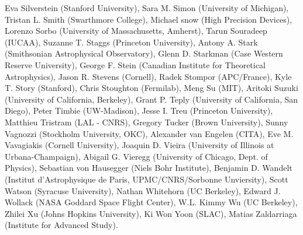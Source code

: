 Eva Silverstein (Stanford University),
Sara M. Simon (University of Michigan),
Tristan L. Smith (Swarthmore College),
Michael snow (High Precision Devices),
Lorenzo Sorbo (University of Massachusetts, Amherst),
Tarun Souradeep (IUCAA),
Suzanne T. Staggs (Princeton University),
Antony A. Stark (Smithsonian Astrophysical Observatory),
Glenn D. Starkman (Case Western Reserve University),
George F. Stein (Canadian Institute for Theoretical Astrophysics),
Jason R. Stevens (Cornell),
Radek Stompor (APC/France),
Kyle T. Story (Stanford),
Chris Stoughton (Fermilab),
Meng Su (MIT),
Aritoki Suzuki (University of California, Berkeley),
Grant P. Teply (University of California, San Diego),
Peter Timbie (UW-Madison),
Jesse I. Treu (Princeton University),
Matthieu Tristram (LAL - CNRS),
Gregory Tucker (Brown University),
Sunny Vagnozzi (Stockholm University, OKC),
Alexander van Engelen (CITA),
Eve M. Vavagiakis (Cornell University),
Joaquin D. Vieira (University of Illinois at Urbana-Champaign),
Abigail G. Vieregg (University of Chicago, Dept. of Physics),
Sebastian von Hausegger (Niels Bohr Institute),
Benjamin D. Wandelt (Institut d'Astrophysique de Paris, UPMC/CNRS/Sorbonne Unviersity),
Scott Watson (Syracuse University),
Nathan Whitehorn (UC Berkeley),
Edward J. Wollack (NASA Goddard Space Flight Center),
W.L. Kimmy Wu (UC Berkeley),
Zhilei Xu (Johns Hopkins University),
Ki Won Yoon (SLAC),
Matias Zaldarriaga (Institute for Advanced Study).
